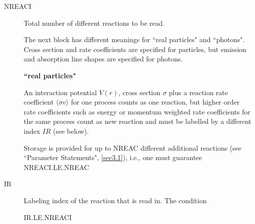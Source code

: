 \begin{description}

  \item[NREACI] Total number of different reactions to be read.

        The next block has different meanings for ``real particles" and ``photons".
        Cross section and rate coefficients are specified for particles, but emission
        and absorption line shapes are specified for photons.

        \textbf{``real particles"}

        An interaction potential $V(r)$, cross section $\sigma$ plus a reaction rate
        coefficient $\langle\sigma v\rangle$ for one process counts as one reaction,
        but higher order rate coefficients such as energy or momentum weighted rate
        coefficients for the same process count as new reaction and must be labelled by
        a different index $IR$ (see below).

        Storage is provided for up to NREAC different additional reactions (see
        ``Parameter Statements", \cref{sec3.1}), i.e., one must guarantee
        NREACI.LE.NREAC

  \item[IR] Labeling index of the reaction that is read in.
        The condition

        IR.LE.NREACI


\end{description}
